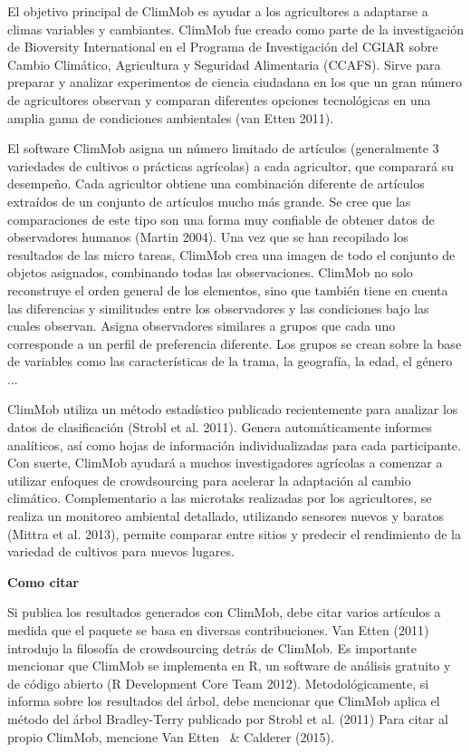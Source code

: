 \documentclass[10pt]{article}
\begin{document}
\begin{titlepage}
El objetivo principal de ClimMob es ayudar a los agricultores a adaptarse a climas variables y cambiantes. ClimMob fue creado como parte de la investigación de Bioversity International en el Programa de Investigación del CGIAR sobre Cambio Climático, Agricultura y Seguridad Alimentaria (CCAFS). Sirve para preparar y analizar experimentos de ciencia ciudadana en los que un gran número de agricultores observan y comparan diferentes opciones tecnológicas en una amplia gama de condiciones ambientales (van Etten 2011). \par
El software ClimMob asigna un número limitado de artículos (generalmente 3 variedades de cultivos o prácticas agrícolas) a cada agricultor, que comparará su desempeño. Cada agricultor obtiene una combinación diferente de artículos extraídos de un conjunto de artículos mucho más grande. Se cree que las comparaciones de este tipo son una forma muy confiable de obtener datos de observadores humanos (Martin 2004). Una vez que se han recopilado los resultados de las micro tareas, ClimMob crea una imagen de todo el conjunto de objetos asignados, combinando todas las observaciones. ClimMob no solo reconstruye el orden general de los elementos, sino que también tiene en cuenta las diferencias y similitudes entre los observadores y las condiciones bajo las cuales observan. Asigna observadores similares a grupos que cada uno corresponde a un perfil de preferencia diferente. Los grupos se crean sobre la base de variables como las características de la trama, la geografía, la edad, el género ... \par
ClimMob utiliza un método estadístico publicado recientemente para analizar los datos de clasificación (Strobl et al. 2011). Genera automáticamente informes analíticos, así como hojas de información individualizadas para cada participante. Con suerte, ClimMob ayudará a muchos investigadores agrícolas a comenzar a utilizar enfoques de crowdsourcing para acelerar la adaptación al cambio climático.
Complementario a las microtaks realizadas por los agricultores, se realiza un monitoreo ambiental detallado, utilizando sensores nuevos y baratos (Mittra et al. 2013), permite comparar entre sitios y predecir el rendimiento de la variedad de cultivos para nuevos lugares.

\vfill
\noindent\makebox[\linewidth]{\rule{\textwidth}{0.4pt}}

\textbf{Como citar}

	Si publica los resultados generados con ClimMob, debe citar varios artículos a medida que el paquete se basa en diversas contribuciones. Van Etten (2011) introdujo la filosofía de crowdsourcing detrás de ClimMob. Es importante mencionar que ClimMob se implementa en R, un software de análisis gratuito y de código abierto (R Development Core Team 2012). Metodológicamente, si informa sobre los resultados del árbol, debe mencionar que ClimMob aplica el método del árbol Bradley-Terry publicado por Strobl et al. (2011) Para citar al propio ClimMob, mencione Van Etten \ & Calderer (2015).


\end{titlepage}
\end{document}
